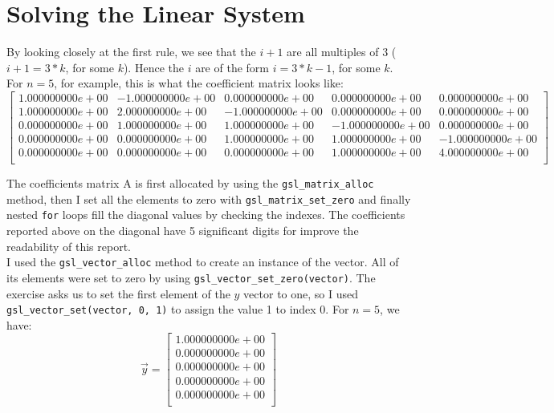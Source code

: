 \documentclass{article}
\newcommand{\code}{\texttt}
\begin{document}
\section{Solving the Linear System}
By looking closely at the first rule, we see that the $i+1$ are all multiples of 3 ($i+1 = 3*k$, for some $k$). Hence the $i$ are of the form $i = 3*k-1$, for some $k$. For $n = 5$, for example, this is what the coefficient matrix looks like:
$$
\begin{bmatrix}
1.000000000e+00 & -1.000000000e+00 & 0.000000000e+00 & 0.000000000e+00 & 0.000000000e+00 \\ 
1.000000000e+00 & 2.000000000e+00 & -1.000000000e+00 & 0.000000000e+00 & 0.000000000e+00 \\ 
0.000000000e+00 & 1.000000000e+00 & 1.000000000e+00 & -1.000000000e+00 & 0.000000000e+00 \\ 
0.000000000e+00 & 0.000000000e+00 & 1.000000000e+00 & 1.000000000e+00 & -1.000000000e+00 \\ 
0.000000000e+00 & 0.000000000e+00 & 0.000000000e+00 & 1.000000000e+00 & 4.000000000e+00 \\
\end{bmatrix}
$$

The coefficients matrix A is first allocated by using the \code{gsl\_matrix\_alloc} method, then I set all the elements to zero with \code{gsl\_matrix\_set\_zero} and finally nested \code{for} loops fill the diagonal values by checking the indexes. The coefficients reported above on the diagonal have 5 significant digits for improve the readability of this report.\\

I used the \code{gsl\_vector\_alloc} method to create an instance of the vector. All of its elements were set to zero by using \code{gsl\_vector\_set\_zero(vector)}. The exercise asks us to set the first element of the $y$ vector to one, so I used \code{gsl\_vector\_set(vector, 0, 1)} to assign the value 1 to index 0. For $n=5$, we have:
$$
\vec{y}=
\begin{bmatrix}
1.000000000e+00 \\
0.000000000e+00 \\
0.000000000e+00 \\
0.000000000e+00 \\
0.000000000e+00 \\
\end{bmatrix}
$$
\end{document}
